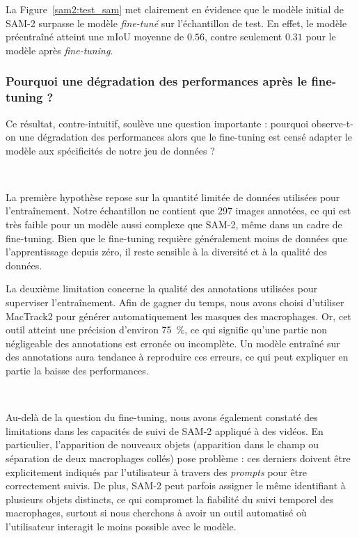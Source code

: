 \documentclass[a4paper,12pt]{report}
\newcommand{\figref}[1]{Figure~\ref{#1}}
\begin{document}
La \figref{sam2:test_sam} met clairement en évidence que le modèle initial de SAM-2 surpasse le modèle \textit{fine-tuné} sur l'échantillon de test. En effet, le modèle préentraîné atteint une mIoU moyenne de $0.56$, contre seulement $0.31$ pour le modèle après \textit{fine-tuning}.

\subsubsection{Pourquoi une dégradation des performances après le fine-tuning ?}

Ce résultat, contre-intuitif, soulève une question importante : pourquoi observe-t-on une dégradation des performances alors que le fine-tuning est censé adapter le modèle aux spécificités de notre jeu de données ?

\

La première hypothèse repose sur la quantité limitée de données utilisées pour l'entraînement. Notre échantillon ne contient que 297 images annotées, ce qui est très faible pour un modèle aussi complexe que SAM-2, même dans un cadre de fine-tuning. Bien que le fine-tuning requière généralement moins de données que l'apprentissage depuis zéro, il reste sensible à la diversité et à la qualité des données.

La deuxième limitation concerne la qualité des annotations utilisées pour superviser l'entraînement. Afin de gagner du temps, nous avons choisi d'utiliser MacTrack2 pour générer automatiquement les masques des macrophages. Or, cet outil atteint une précision d'environ 75~\%, ce qui signifie qu'une partie non négligeable des annotations est erronée ou incomplète. Un modèle entraîné sur des annotations aura tendance à reproduire ces erreurs, ce qui peut expliquer en partie la baisse des performances.

\

Au-delà de la question du fine-tuning, nous avons également constaté des limitations dans les capacités de suivi de SAM-2 appliqué à des vidéos. En particulier, l'apparition de nouveaux objets (apparition dans le champ ou séparation de deux macrophages collés) pose problème : ces derniers doivent être explicitement indiqués par l'utilisateur à travers des \textit{prompts} pour être correctement suivis. De plus, SAM-2 peut parfois assigner le même identifiant à plusieurs objets distincts, ce qui compromet la fiabilité du suivi temporel des macrophages, surtout si nous cherchons à avoir un outil automatisé où l'utilisateur interagit le moins possible avec le modèle.
\end{document}
